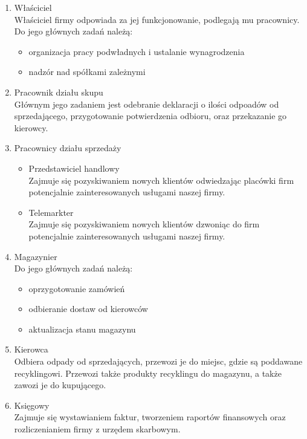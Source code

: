 
\begin{enumerate}
	\item Właściciel \\ 
	Właściciel firmy odpowiada za jej funkcjonowanie, podlegają mu pracownicy. Do jego głównych zadań należą:
	\begin{itemize}
		\item organizacja pracy podwładnych i ustalanie wynagrodzenia
		\item nadzór nad spółkami zależnymi
	\end{itemize}
	\item Pracownik działu skupu \\
	Głównym jego zadaniem jest odebranie deklaracji o ilości odpoadów od sprzedającego, przygotowanie potwierdzenia odbioru, oraz przekazanie go kierowcy.
	\item Pracownicy działu sprzedaży
	\begin{itemize}
	\item Przedstawiciel handlowy \\
	Zajmuje się pozyskiwaniem nowych klientów odwiedzając placówki firm potencjalnie zainteresowanych usługami naszej firmy.
	\item Telemarkter \\
	Zajmuje się pozyskiwaniem nowych klientów dzwoniąc do firm potencjalnie zainteresowanych usługami naszej firmy.
	\end{itemize}
	\item Magazynier \\
	Do jego głównych zadań należą:
		\begin{itemize}
		\item oprzygotowanie zamówień
		\item odbieranie dostaw od kierowców
		\item aktualizacja stanu magazynu
		\end{itemize}
	\item Kierowca \\
	Odbiera odpady od sprzedających, przewozi je do miejsc, gdzie są poddawane recyklingowi. Przewozi także produkty recyklingu do magazynu, a także zawozi je do kupującego.
	\item Księgowy \\
	Zajmuje się wystawianiem faktur, tworzeniem raportów finansowych oraz rozliczenianiem firmy z urzędem skarbowym.
	
\end{enumerate}

